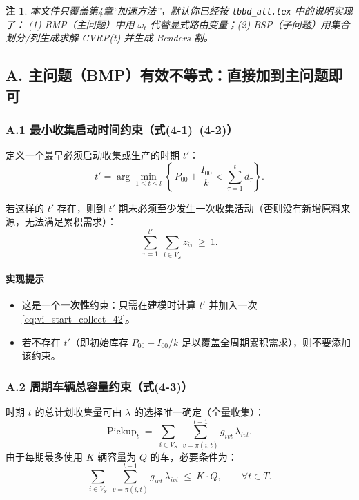 \documentclass{article}
\newtheorem{remark}{注}
\begin{document}
\begin{remark}
本文件只覆盖第4章“加速方法”，默认你已经按 \texttt{lbbd\_all.tex} 中的说明实现了：
(1) BMP（主问题）中用 $\omega_t$ 代替显式路由变量；(2) BSP（子问题）用集合划分/列生成求解 CVRP(t) 并生成 Benders 割。
\end{remark}

\subsection{A. 主问题（BMP）有效不等式：直接加到主问题即可}

\subsubsection*{A.1 最小收集启动时间约束（式(4-1)--(4-2)）}

定义一个最早必须启动收集或生产的时期 $t'$：
\begin{equation}
t'=\arg\min_{1\le t\le l}\left\{\,P_{00}+\frac{I_{00}}{k}<\sum_{\tau=1}^{t} d_{\tau}\right\}.
\label{eq:tprime_def_41}
\end{equation}

若这样的 $t'$ 存在，则到 $t'$ 期末必须至少发生一次收集活动（否则没有新增原料来源，无法满足累积需求）：
\begin{equation}
\sum_{\tau=1}^{t'}\ \sum_{i\in V_S} z_{i\tau}\ \ge\ 1.
\label{eq:vi_start_collect_42}
\end{equation}

\paragraph{实现提示}
\begin{itemize}[leftmargin=2em]
  \item 这是一个\textbf{一次性}约束：只需在建模时计算 $t'$ 并加入一次 \eqref{eq:vi_start_collect_42}。
  \item 若不存在 $t'$（即初始库存 $P_{00}+I_{00}/k$ 足以覆盖全周期累积需求），则不要添加该约束。
\end{itemize}

\subsubsection*{A.2 周期车辆总容量约束（式(4-3)）}

时期 $t$ 的总计划收集量可由 $\lambda$ 的选择唯一确定（全量收集）：
\[
\text{Pickup}_t \;=\; \sum_{i\in V_S}\ \sum_{v=\pi(i,t)}^{t-1} g_{ivt}\,\lambda_{ivt}.
\]
由于每期最多使用 $K$ 辆容量为 $Q$ 的车，必要条件为：
\begin{equation}
\sum_{i\in V_S}\ \sum_{v=\pi(i,t)}^{t-1} g_{ivt}\,\lambda_{ivt}\ \le\ K\cdot Q,\qquad \forall t\in T.
\label{eq:vi_totalcap_43}
\end{equation}
\end{document}
